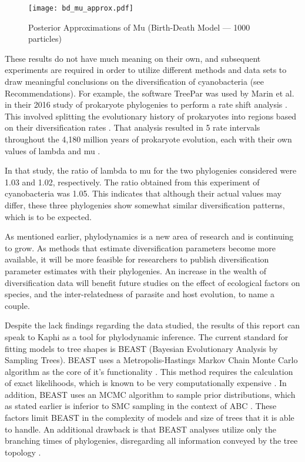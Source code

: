 \documentclass[12pt]{article}
\begin{document}
\begin{figure}[ht]
\texttt{[image: bd\_mu\_approx.pdf]}
\caption[Approximation of mu (birth-death)]{Posterior Approximations of Mu (Birth-Death Model — 1000 particles)}
\centering
\label{9}
\end{figure}

	These results do not have much meaning on their own, and subsequent experiments are required in order to utilize different methods and data sets to draw meaningful conclusions on the diversification of cyanobacteria (see Recommendations). For example, the software TreePar was used by Marin et al. in their 2016 study of prokaryote phylogenies to perform a rate shift analysis \cite{marin2016timetree}. This involved splitting the evolutionary history of prokaryotes into regions based on their diversification rates \cite{marin2016timetree}. That analysis resulted in 5 rate intervals throughout the 4,180 million years of prokaryote evolution, each with their own values of lambda and mu \cite{marin2016timetree}.

	In that study, the ratio of lambda to mu for the two phylogenies considered were 1.03 and 1.02, respectively. The ratio obtained from this experiment of cyanobacteria was 1.05. This indicates that although their actual values may differ, these three phylogenies show somewhat similar diversification patterns, which is to be expected.

	As mentioned earlier, phylodynamics is a new area of research and is continuing to grow. As methods that estimate diversification parameters become more available, it will be more feasible for researchers to publish diversification parameter estimates with their phylogenies. An increase in the wealth of diversification data will benefit future studies on the effect of ecological factors on species, and the inter-relatedness of parasite and host evolution, to name a couple.

	Despite the lack findings regarding the data studied, the results of this report can speak to Kaphi as a tool for phylodynamic inference. The current standard for fitting models to tree shapes is BEAST (Bayesian Evolutionary Analysis by Sampling Trees). BEAST uses a Metropolis-Hastings Markov Chain Monte Carlo algorithm as the core of it's functionality \cite{drummond2007beast}. This method requires the calculation of exact likelihoods, which is known to be very computationally expensive \cite{sunnaaker2013approximate}. In addition, BEAST uses an MCMC algorithm to sample prior distributions, which as stated earlier is inferior to SMC sampling in the context of ABC \cite{sisson2007sequential}. These factors limit BEAST in the complexity of models and size of trees that it is able to handle. An additional drawback is that BEAST analyses utilize only the branching times of phylogenies, disregarding all information conveyed by the tree topology \cite{drummond2007beast}.
\end{document}
